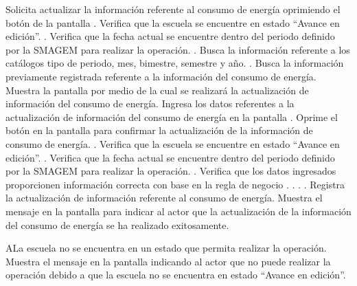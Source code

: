 \begin{UCtrayectoria}
    \UCpaso[\UCactor] Solicita actualizar la información referente al consumo de energía oprimiendo el botón  de la pantalla .
    \UCpaso[\UCsist] Verifica que la escuela se encuentre en estado ``Avance en edición''. .
    \UCpaso[\UCsist] Verifica que la fecha actual se encuentre dentro del periodo definido por la SMAGEM para realizar la operación. .
    \UCpaso[\UCsist] Busca la información referente a los catálogos tipo de periodo, mes, bimestre, semestre y año. .
    \UCpaso[\UCsist] Busca la información previamente registrada referente a la información del consumo de energía.
    \UCpaso[\UCsist] Muestra la pantalla  por medio de la cual se realizará la actualización de información del consumo de energía.
    \UCpaso[\UCactor] Ingresa los datos referentes a la actualización de información del consumo de energía en la pantalla . \label{cus25:IngresarDatos}
    \UCpaso[\UCactor] Oprime el botón  en la pantalla  para confirmar la actualización de la información de consumo de energía. . 
    \UCpaso[\UCsist] Verifica que la escuela se encuentre en estado ``Avance en edición''. .
    \UCpaso[\UCsist] Verifica que la fecha actual se encuentre dentro del periodo definido por la SMAGEM para realizar la operación. .
    \UCpaso[\UCsist] Verifica que los datos ingresados proporcionen información correcta con base en la regla de negocio . . . .
    \UCpaso[\UCsist] Registra la actualización de información referente al consumo de energía.
    \UCpaso[\UCsist] Muestra el mensaje  en la pantalla  para indicar al actor que la actualización de la información del consumo de energía se ha realizado exitosamente.    
 \end{UCtrayectoria}
 
      \begin{UCtrayectoriaA}{A}{La escuela no se encuentra en un estado que permita realizar la operación.}
	\UCpaso[\UCsist] Muestra el mensaje  en la pantalla  indicando al actor que no puede realizar la operación debido a que la escuela no se encuentra en estado ``Avance en edición''. 
    \end{UCtrayectoriaA}
 
